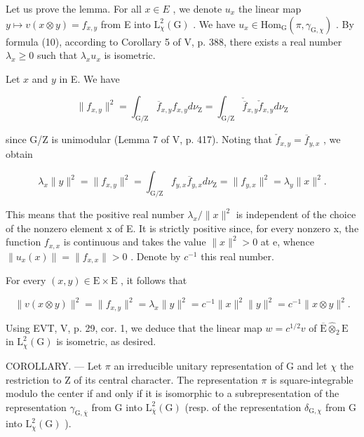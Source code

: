  Let us prove the lemma. For all \(x \in E\) , we denote \(u_{x}\) the linear map \(y \mapsto v(x \otimes y) = f_{x,y}\) from E into \(\mathrm{L}_{\chi}^{2}(\mathrm{G})\) . We have \(u_{x} \in \mathrm{Hom}_{\mathrm{G}}(\pi, \gamma_{\mathrm{G},\chi})\) . By formula (10), according to Corollary 5 of V, p. 388, there exists a real number \(\lambda_{x} \geqslant 0\) such that \(\lambda_{x}u_{x}\) is isometric.

Let \(x\) and \(y\) in E. We have

\[
\| f _ {x, y} \| ^ {2} = \int_ {\mathrm{G/Z}} \overline {{f}} _ {x, y} f _ {x, y} d \nu_ {\mathrm{Z}} = \int_ {\mathrm{G/Z}} \check {\overline {{f}}} _ {x, y} \check {f} _ {x, y} d \nu_ {\mathrm{Z}}
\]

since G/Z is unimodular (Lemma 7 of V, p. 417). Noting that \(\check{f}_{x,y} = \overline{f}_{y,x}\) , we obtain

\[
\lambda_ {x} \| y \| ^ {2} = \| f _ {x, y} \| ^ {2} = \int_ {\mathrm{G/Z}} f _ {y, x} \overline {{f}} _ {y, x} d \nu_ {\mathrm{Z}} = \| f _ {y, x} \| ^ {2} = \lambda_ {y} \| x \| ^ {2}.
\]

This means that the positive real number \(\lambda_{x}/\|x\|^{2}\) is independent of the choice of the nonzero element x of E. It is strictly positive since, for every nonzero x, the function \(f_{x,x}\) is continuous and takes the value \(\|x\|^{2}>0\) at e, whence \(\|u_{x}(x)\|=\|f_{x,x}\|>0\) . Denote by \(c^{-1}\) this real number.

For every \((x,y)\in\mathrm{E}\times\mathrm{E}\) , it follows that

\[
\| v (x \otimes y) \| ^ {2} = \| f _ {x, y} \| ^ {2} = \lambda_ {x} \| y \| ^ {2} = c ^ {- 1} \| x \| ^ {2} \| y \| ^ {2} = c ^ {- 1} \| x \otimes y \| ^ {2}.
\]

Using EVT, V, p. 29, cor. 1, we deduce that the linear map \(w = c^{1/2}v\) of \(\overline{\mathrm{E}}\widehat{\otimes}_2\mathrm{E}\) in \(\mathrm{L}_{\chi}^{2}(\mathrm{G})\) is isometric, as desired.

 COROLLARY. --- Let \(\pi\) an irreducible unitary representation of G and let \(\chi\) the restriction to Z of its central character. The representation \(\pi\) is square-integrable modulo the center if and only if it is isomorphic to a subrepresentation of the representation \(\gamma_{\mathrm{G},\overline{\chi}}\) from G into \(\mathrm{L}_{\overline{\chi}}^{2}(\mathrm{G})\) (resp. of the representation \(\delta_{\mathrm{G},\chi}\) from G into \(\mathrm{L}_{\chi}^{2}(\mathrm{G})\) ).

